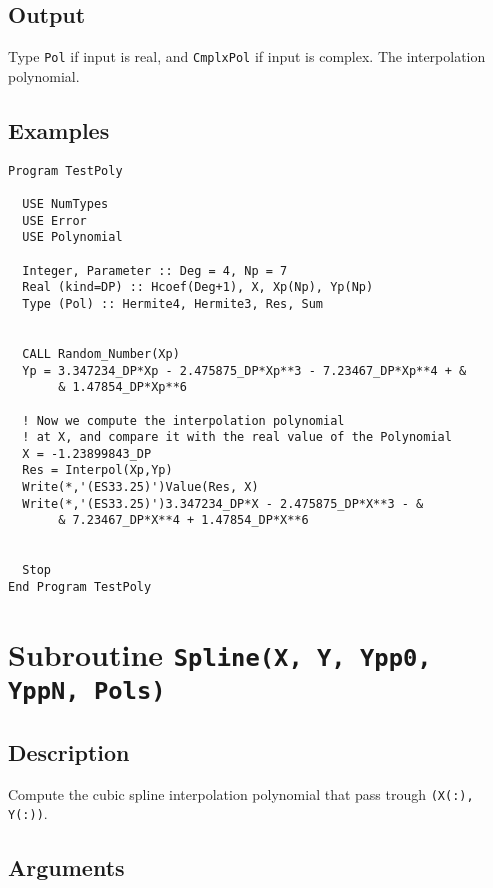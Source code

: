 \subsection{Output}

Type \texttt{Pol} if input is real, and \texttt{CmplxPol} if input is
complex. The interpolation polynomial. 

\subsection{Examples}

\begin{lstlisting}[emph=Interpol,
                   emphstyle=\color{blue},
                   frame=trBL,
                   caption=Computes the interpolation polynomial.,
                   label=interpol]
Program TestPoly

  USE NumTypes
  USE Error
  USE Polynomial

  Integer, Parameter :: Deg = 4, Np = 7
  Real (kind=DP) :: Hcoef(Deg+1), X, Xp(Np), Yp(Np)
  Type (Pol) :: Hermite4, Hermite3, Res, Sum


  CALL Random_Number(Xp)
  Yp = 3.347234_DP*Xp - 2.475875_DP*Xp**3 - 7.23467_DP*Xp**4 + &
       & 1.47854_DP*Xp**6

  ! Now we compute the interpolation polynomial
  ! at X, and compare it with the real value of the Polynomial
  X = -1.23899843_DP
  Res = Interpol(Xp,Yp)
  Write(*,'(ES33.25)')Value(Res, X)
  Write(*,'(ES33.25)')3.347234_DP*X - 2.475875_DP*X**3 - &
       & 7.23467_DP*X**4 + 1.47854_DP*X**6


  Stop
End Program TestPoly
\end{lstlisting}

\section{Subroutine \texttt{Spline(X, Y, Ypp0, YppN, Pols)}}

\subsection{Description}

Compute the cubic spline interpolation polynomial that pass trough
\texttt{(X(:), Y(:))}.

\subsection{Arguments}


